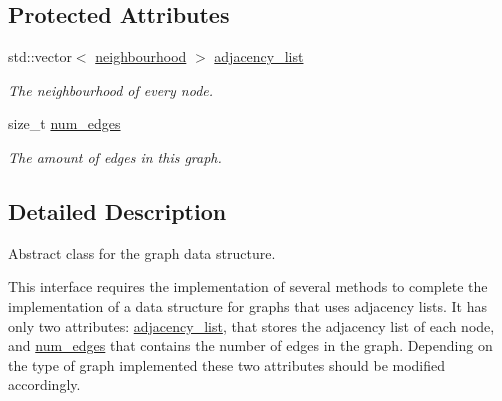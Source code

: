 \subsection*{Protected Attributes}
\begin{DoxyCompactItemize}
\item 
\hypertarget{classlgraph_1_1xxgraph_a31cf82d0b20be05290be259dc97a51ec}{std\-::vector$<$ \hyperlink{namespacelgraph_a052e7766c13f3a43cec0aec8173fdede}{neighbourhood} $>$ \hyperlink{classlgraph_1_1xxgraph_a31cf82d0b20be05290be259dc97a51ec}{adjacency\-\_\-list}}\label{classlgraph_1_1xxgraph_a31cf82d0b20be05290be259dc97a51ec}

\begin{DoxyCompactList}\small\item\em The neighbourhood of every node. \end{DoxyCompactList}\item 
\hypertarget{classlgraph_1_1xxgraph_a6765a9a3be42f6e0f824635c593b35d7}{size\-\_\-t \hyperlink{classlgraph_1_1xxgraph_a6765a9a3be42f6e0f824635c593b35d7}{num\-\_\-edges}}\label{classlgraph_1_1xxgraph_a6765a9a3be42f6e0f824635c593b35d7}

\begin{DoxyCompactList}\small\item\em The amount of edges in this graph. \end{DoxyCompactList}\end{DoxyCompactItemize}


\subsection{Detailed Description}
Abstract class for the graph data structure. 

This interface requires the implementation of several methods to complete the implementation of a data structure for graphs that uses adjacency lists. It has only two attributes\-: \hyperlink{classlgraph_1_1xxgraph_a31cf82d0b20be05290be259dc97a51ec}{adjacency\-\_\-list}, that stores the adjacency list of each node, and \hyperlink{classlgraph_1_1xxgraph_a6765a9a3be42f6e0f824635c593b35d7}{num\-\_\-edges} that contains the number of edges in the graph. Depending on the type of graph implemented these two attributes should be modified accordingly. 

